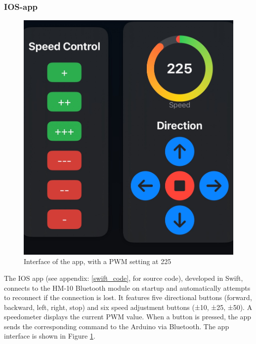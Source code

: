 \subsubsection{IOS-app}
\begin{figure}
    \centering
    \includegraphics[width=1\linewidth]{images/IOS_app_interface.png}
    \caption{Interface of the app, with a PWM setting at 225}
    \label{fig:app_interface}
\end{figure}
The IOS app (see appendix: \ref{swift_code}, for source code), developed in Swift, connects to the HM-10 Bluetooth module on startup and automatically attempts to reconnect if the connection is lost. It features five directional buttons (forward, backward, left, right, stop) and six speed adjustment buttons (±10, ±25, ±50). A speedometer displays the current PWM value. When a button is pressed, the app sends the corresponding command to the Arduino via Bluetooth. The app interface is shown in Figure \ref{fig:app_interface}.